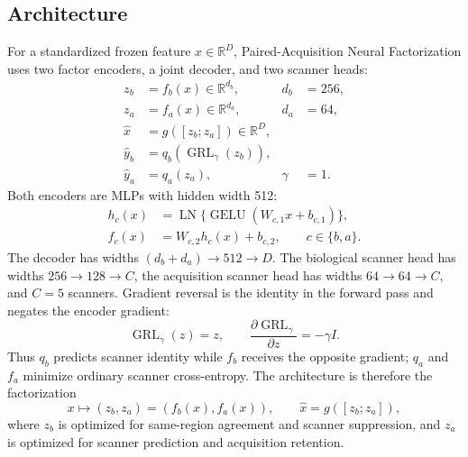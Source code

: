 \subsection{Architecture}
For a standardized frozen feature $x\in\mathbb{R}^{D}$, Paired-Acquisition Neural Factorization uses two factor encoders, a joint decoder, and two scanner heads:
\begin{align}
 z_b &= f_b(x)\in\mathbb{R}^{d_b}, & d_b&=256,\\
 z_a &= f_a(x)\in\mathbb{R}^{d_a}, & d_a&=64,\\
 \widehat{x} &= g([z_b;z_a])\in\mathbb{R}^{D},\\
 \widehat{y}_{b} &= q_b(\operatorname{GRL}_{\gamma}(z_b)),\\
 \widehat{y}_{a} &= q_a(z_a), & \gamma&=1.
\end{align}
Both encoders are MLPs with hidden width 512:
\begin{align}
 h_c(x)&=\operatorname{LN}\{\operatorname{GELU}(W_{c,1}x+b_{c,1})\},\\
 f_c(x)&=W_{c,2}h_c(x)+b_{c,2},\qquad c\in\{b,a\}.
\end{align}
The decoder has widths $(d_b+d_a)\to512\to D$. The biological scanner head has widths $256\to128\to C$, the acquisition scanner head has widths $64\to64\to C$, and $C=5$ scanners. Gradient reversal is the identity in the forward pass and negates the encoder gradient:
\begin{equation}
 \operatorname{GRL}_{\gamma}(z)=z,
 \qquad
 \frac{\partial\operatorname{GRL}_{\gamma}}{\partial z}=-\gamma I.
\end{equation}
Thus $q_b$ predicts scanner identity while $f_b$ receives the opposite gradient; $q_a$ and $f_a$ minimize ordinary scanner cross-entropy. The architecture is therefore the factorization
\begin{equation}
 x\mapsto (z_b,z_a)=(f_b(x),f_a(x)),
 \qquad
 \widehat{x}=g([z_b;z_a]),
\end{equation}
where $z_b$ is optimized for same-region agreement and scanner suppression, and $z_a$ is optimized for scanner prediction and acquisition retention.


